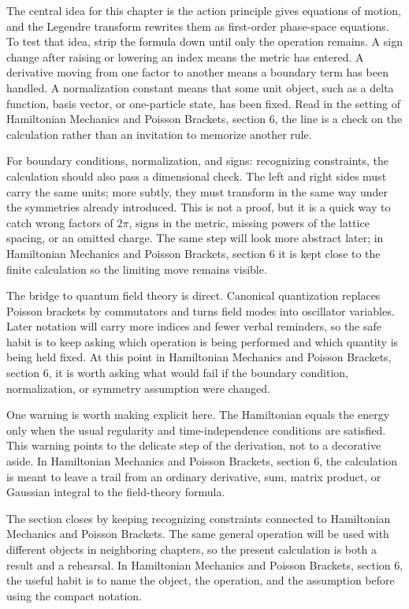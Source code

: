 The central idea for this chapter is the action principle gives equations of motion, and the Legendre transform rewrites them as first-order phase-space equations.  To test that idea, strip the formula down until only the operation remains.  A sign change after raising or lowering an index means the metric has entered.  A derivative moving from one factor to another means a boundary term has been handled.  A normalization constant means that some unit object, such as a delta function, basis vector, or one-particle state, has been fixed.  Read in the setting of Hamiltonian Mechanics and Poisson Brackets, section 6, the line is a check on the calculation rather than an invitation to memorize another rule.

For boundary conditions, normalization, and signs: recognizing constraints, the calculation should also pass a dimensional check.  The left and right sides must carry the same units; more subtly, they must transform in the same way under the symmetries already introduced.  This is not a proof, but it is a quick way to catch wrong factors of \(2\pi\), signs in the metric, missing powers of the lattice spacing, or an omitted charge.  The same step will look more abstract later; in Hamiltonian Mechanics and Poisson Brackets, section 6 it is kept close to the finite calculation so the limiting move remains visible.

The bridge to quantum field theory is direct.  Canonical quantization replaces Poisson brackets by commutators and turns field modes into oscillator variables.  Later notation will carry more indices and fewer verbal reminders, so the safe habit is to keep asking which operation is being performed and which quantity is being held fixed.  At this point in Hamiltonian Mechanics and Poisson Brackets, section 6, it is worth asking what would fail if the boundary condition, normalization, or symmetry assumption were changed.

One warning is worth making explicit here.  The Hamiltonian equals the energy only when the usual regularity and time-independence conditions are satisfied.  This warning points to the delicate step of the derivation, not to a decorative aside.  In Hamiltonian Mechanics and Poisson Brackets, section 6, the calculation is meant to leave a trail from an ordinary derivative, sum, matrix product, or Gaussian integral to the field-theory formula.

The section closes by keeping recognizing constraints connected to Hamiltonian Mechanics and Poisson Brackets.  The same general operation will be used with different objects in neighboring chapters, so the present calculation is both a result and a rehearsal.  In Hamiltonian Mechanics and Poisson Brackets, section 6, the useful habit is to name the object, the operation, and the assumption before using the compact notation.




